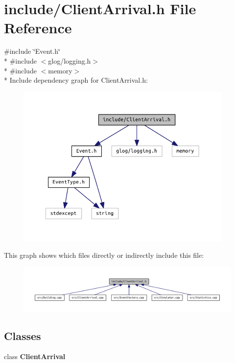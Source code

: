 \section{include/\+Client\+Arrival.h File Reference}
\label{_client_arrival_8h}
{\ttfamily \#include \char`\"{}Event.\+h\char`\"{}}\\*
{\ttfamily \#include $<$glog/logging.\+h$>$}\\*
{\ttfamily \#include $<$memory$>$}\\*
Include dependency graph for Client\+Arrival.\+h\+:\nopagebreak
\begin{figure}[H]
\begin{center}
\leavevmode
\includegraphics[width=303pt]{_client_arrival_8h__incl}
\end{center}
\end{figure}
This graph shows which files directly or indirectly include this file\+:\nopagebreak
\begin{figure}[H]
\begin{center}
\leavevmode
\includegraphics[width=350pt]{_client_arrival_8h__dep__incl}
\end{center}
\end{figure}
\subsection*{Classes}
\begin{DoxyCompactItemize}
\item 
class {\bf Client\+Arrival}
\end{DoxyCompactItemize}
